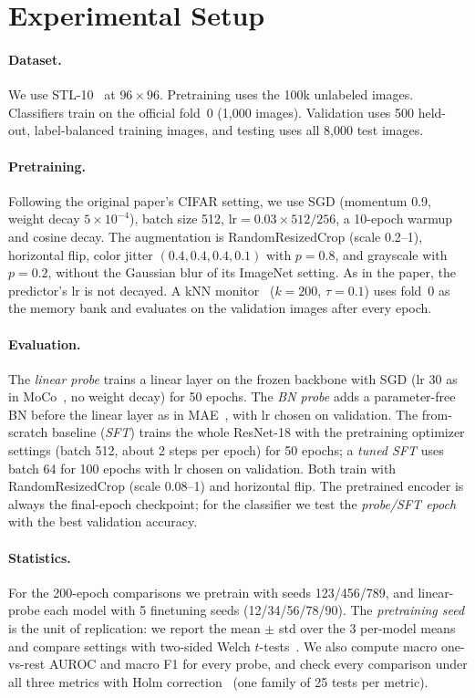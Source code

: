 \documentclass[10pt,twocolumn,letterpaper]{article}
\begin{document}
\section{Experimental Setup}
\label{sec:setup}

\paragraph{Dataset.}
We use STL-10~\cite{coates2011stl10} at $96\times96$. Pretraining uses the 100k unlabeled images.
Classifiers train on the official fold~0 (1,000 images). Validation uses 500 held-out, label-balanced training images, and testing uses all 8,000 test images.

\paragraph{Pretraining.}
Following the original paper's CIFAR setting, we use SGD (momentum 0.9, weight decay $5\!\times\!10^{-4}$), batch size 512, $\text{lr}=0.03\times512/256$, a 10-epoch warmup and cosine decay. The augmentation is RandomResizedCrop (scale 0.2--1), horizontal flip, color jitter $(0.4,0.4,0.4,0.1)$ with $p{=}0.8$, and grayscale with $p{=}0.2$, without the Gaussian blur of its ImageNet setting. As in the paper, the predictor's lr is not decayed.
A kNN monitor~\cite{wu2018instance} ($k{=}200$, $\tau{=}0.1$) uses fold~0 as the memory bank and evaluates on the validation images after every epoch.

\paragraph{Evaluation.}
The \emph{linear probe} trains a linear layer on the frozen backbone with SGD (lr 30 as in MoCo~\cite{he2020moco}, no weight decay) for 50 epochs. The \emph{BN probe} adds a parameter-free BN before the linear layer as in MAE~\cite{he2022mae}, with lr chosen on validation.
The from-scratch baseline (\emph{SFT}) trains the whole ResNet-18 with the pretraining optimizer settings (batch 512, about 2 steps per epoch) for 50 epochs; a \emph{tuned SFT} uses batch 64 for 100 epochs with lr chosen on validation.
Both train with RandomResizedCrop (scale 0.08--1) and horizontal flip.
The pretrained encoder is always the final-epoch checkpoint; for the classifier we test the \emph{probe/SFT epoch} with the best validation accuracy.

\paragraph{Statistics.}
For the 200-epoch comparisons we pretrain with seeds 123/456/789, and linear-probe each model with 5 finetuning seeds (12/34/56/78/90).
The \emph{pretraining seed} is the unit of replication: we report the mean $\pm$ std over the 3 per-model means and compare settings with two-sided Welch $t$-tests~\cite{welch1947}.
We also compute macro one-vs-rest AUROC and macro F1 for every probe, and check every comparison under all three metrics with Holm correction~\cite{holm1979} (one family of 25 tests per metric).
\end{document}
